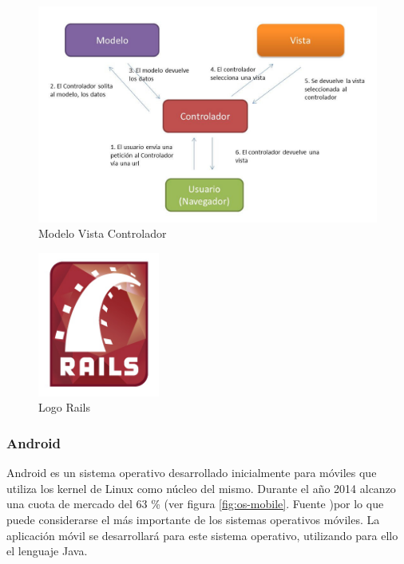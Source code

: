 		\begin{figure}[h!btp]
		\centering
		\includegraphics[width=120mm, fbox={\fboxrule} 4mm]{images/04-metodo/07-mvc.jpg}
		\caption{Modelo Vista Controlador}
		\label{fig:mvc}
		\end{figure}
		
		\begin{figure}[H]
		\centering
		\includegraphics[width=40mm, fbox={\fboxrule} 4mm]{images/04-metodo/08-rails_logo.png}
		\caption{Logo Rails}
		\label{fig:rails-logo}
		\end{figure}
		
		\subsubsection{Android}
		Android es un sistema operativo desarrollado inicialmente para móviles que utiliza los kernel de Linux como núcleo del mismo. Durante el año 2014 alcanzo una cuota de mercado del 63 \% (ver figura \ref{fig:os-mobile}. Fuente \cite{Are15})por lo que puede considerarse el más importante de los sistemas operativos móviles. 
		La aplicación móvil se desarrollará para este sistema operativo, utilizando para ello el lenguaje Java.
		
